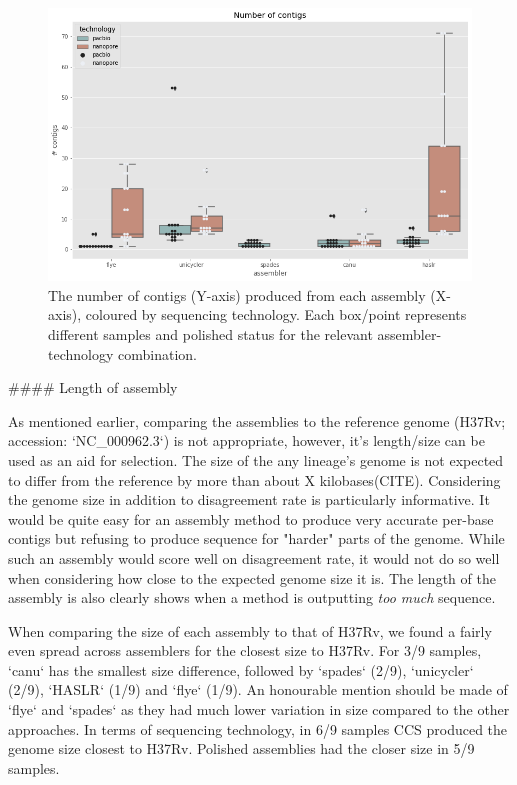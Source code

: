 \begin{figure}
\includegraphics[width=1.0\textwidth]{Chapter2/Figs/num_contigs.png}
\centering
\caption{The number of contigs (Y-axis) produced from each assembly (X-axis), coloured by sequencing technology. Each box/point represents different samples and polished status for the relevant assembler-technology combination.}
\label{fig:num_contigs}
\end{figure}

\begin{markdown}

#### Length of assembly

As mentioned earlier, comparing the assemblies to the \mtb{} reference genome (H37Rv; accession: `NC_000962.3`) is not appropriate, however, it's length/size can be used as an aid for selection. The size of the any lineage's genome is not expected to differ from the reference by more than about X kilobases(CITE). Considering the genome size in addition to disagreement rate is particularly informative. It would be quite easy for an assembly method to produce very accurate per-base contigs but refusing to produce sequence for "harder" parts of the genome. While such an assembly would score well on disagreement rate, it would not do so well when considering how close to the expected genome size it is. The length of the assembly is also clearly shows when a method is outputting \textit{too much} sequence.

When comparing the size of each assembly to that of H37Rv, we found a fairly even spread across assemblers for the closest size to H37Rv. For 3/9 samples, `canu` has the smallest size difference, followed by `spades` (2/9), `unicycler` (2/9), `HASLR` (1/9) and `flye` (1/9). An honourable mention should be made of `flye` and `spades` as they had much lower variation in size compared to the other approaches. In terms of sequencing technology, in 6/9 samples CCS produced the genome size closest to H37Rv. Polished assemblies had the closer size in 5/9 samples.

\end{markdown}

